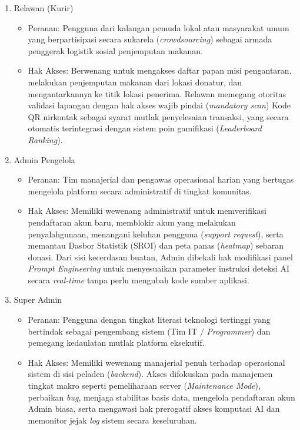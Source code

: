\begin{enumerate}
    \item Relawan (Kurir)
    \begin{itemize}
        \item Peranan: Pengguna dari kalangan pemuda lokal atau masyarakat umum yang berpartisipasi secara sukarela (\textit{crowdsourcing}) sebagai armada penggerak logistik sosial penjemputan makanan.
        \item Hak Akses: Berwenang untuk mengakses daftar papan misi pengantaran, melakukan penjemputan makanan dari lokasi donatur, dan mengantarkannya ke titik lokasi penerima. Relawan memegang otoritas validasi lapangan dengan hak akses wajib pindai (\textit{mandatory scan}) Kode QR nirkontak sebagai syarat mutlak penyelesaian transaksi, yang secara otomatis terintegrasi dengan sistem poin gamifikasi (\textit{Leaderboard Ranking}).
    \end{itemize}

    \item Admin Pengelola
    \begin{itemize}
        \item Peranan: Tim manajerial dan pengawas operasional harian yang bertugas mengelola platform secara administratif di tingkat komunitas.
        \item Hak Akses: Memiliki wewenang administratif untuk memverifikasi pendaftaran akun baru, memblokir akun yang melakukan penyalahgunaan, menangani keluhan pengguna (\textit{support request}), serta memantau Dasbor Statistik (SROI) dan peta panas (\textit{heatmap}) sebaran donasi. Dari sisi kecerdasan buatan, Admin dibekali hak modifikasi panel \textit{Prompt Engineering} untuk menyesuaikan parameter instruksi deteksi AI secara \textit{real-time} tanpa perlu mengubah kode sumber aplikasi.
    \end{itemize}

    \item Super Admin
    \begin{itemize}
        \item Peranan: Pengguna dengan tingkat literasi teknologi tertinggi yang bertindak sebagai pengembang sistem (Tim IT / \textit{Programmer}) dan pemegang kedaulatan mutlak platform eksekutif.
        \item Hak Akses: Memiliki wewenang manajerial penuh terhadap operasional sistem di sisi peladen (\textit{backend}). Akses difokuskan pada manajemen tingkat makro seperti pemeliharaan server (\textit{Maintenance Mode}), perbaikan \textit{bug}, menjaga stabilitas basis data, mengelola pendaftaran akun Admin biasa, serta mengawasi hak prerogatif akses komputasi AI dan memonitor jejak \textit{log} sistem secara keseluruhan.
    \end{itemize}
\end{enumerate}

